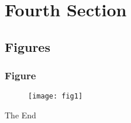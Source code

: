 \documentclass[aspectratio=169,xcolor=dvipsnames]{beamer}
\begin{document}
\section{Fourth Section}

\subsection{Figures}


\begin{frame}
\frametitle{Figure}

\begin{figure}
    \texttt{[image: fig1]}
\end{figure}
\end{frame}


\begin{frame}
\Huge{\centerline{The End}}
\end{frame}

\end{document}
